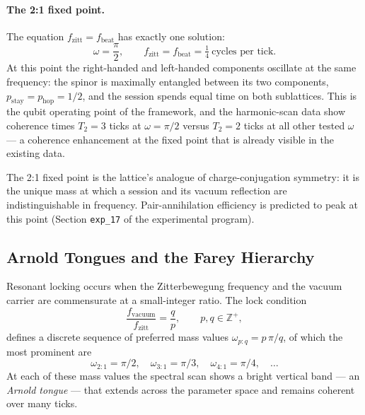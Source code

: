 \paragraph{The 2:1 fixed point.}
The equation $f_\text{zitt} = f_\text{beat}$ has exactly one
solution:
\begin{equation}
    \omega = \frac{\pi}{2}, \qquad
    f_\text{zitt} = f_\text{beat} = \tfrac{1}{4}\ \text{cycles per tick}.
    \label{eq:two_to_one_fixed}
\end{equation}
At this point the right-handed and left-handed components oscillate
at the same frequency: the spinor is maximally entangled between its
two components, $p_\text{stay} = p_\text{hop} = 1/2$, and the session
spends equal time on both sublattices. This is the qubit operating
point of the framework, and the harmonic-scan data show coherence
times $T_2 = 3$ ticks at $\omega = \pi/2$ versus $T_2 = 2$ ticks at
all other tested $\omega$ --- a coherence enhancement at the fixed
point that is already visible in the existing data.

The 2:1 fixed point is the lattice's analogue of charge-conjugation
symmetry: it is the unique mass at which a session and its vacuum
reflection are indistinguishable in frequency. Pair-annihilation
efficiency is predicted to peak at this point (Section
\texttt{exp\_17} of the experimental program).

\subsection{Arnold Tongues and the Farey Hierarchy}
\label{subsec:arnold_tongues}

Resonant locking occurs when the Zitterbewegung frequency and the
vacuum carrier are commensurate at a small-integer ratio. The lock
condition
\begin{equation}
    \frac{f_\text{vacuum}}{f_\text{zitt}}
        = \frac{q}{p}, \qquad p, q \in \mathbb{Z}^+,
    \label{eq:lock_condition}
\end{equation}
defines a discrete sequence of preferred mass values
$\omega_{p:q} = p\,\pi/q$, of which the most prominent are
\begin{equation}
    \omega_{2:1} = \pi/2, \quad
    \omega_{3:1} = \pi/3, \quad
    \omega_{4:1} = \pi/4, \quad \ldots
\end{equation}
At each of these mass values the spectral scan shows a bright
vertical band --- an \emph{Arnold tongue} --- that extends across
the parameter space and remains coherent over many ticks.

